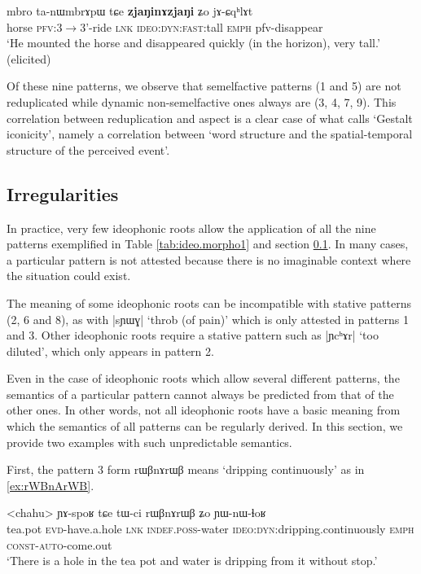 \documentclass[oldfontcommands,oneside,a4paper,11pt]{article}
\newcommand{\ipa}[1]{{\phon \mbox{#1}}} %
\begin{document}
    \begin{exe} 
\ex  \label{ex:ideo9}
\gll 
\ipa{mbro}  	\ipa{ta-nɯmbrɤpɯ}  	\ipa{tɕe}  	\ipa{\textbf{zjaŋinɤzjaŋi}}  	\ipa{ʑo}  	\ipa{jɤ-ɕqʰlɤt}  \\
horse \textsc{pfv}:3$\rightarrow$3'-ride \textsc{lnk} \textsc{ideo:dyn:fast}:tall \textsc{emph} pfv-disappear \\
\glt `He mounted the horse and disappeared quickly (in the horizon), very tall.'  (elicited)
   \end{exe}


Of these nine patterns, we observe that semelfactive  patterns (1 and 5) are not reduplicated while dynamic non-semelfactive ones always are (3, 4, 7, 9). This correlation between reduplication and aspect is a clear case of what \citet[47]{dingemanse11ezra} calls `Gestalt iconicity', namely a correlation between `word structure and the spatial-temporal structure of the perceived event'. 
 

\subsection{Irregularities} \label{sec:ideo.irregular}
In practice, very few ideophonic roots allow the application of all the nine patterns exemplified in Table \ref{tab:ideo.morpho1}  and section \ref{sec:ideo.irregular}.  In many cases, a particular pattern is not attested because there is no imaginable context where the situation could exist.

The meaning of some ideophonic roots can be incompatible with stative patterns (2, 6 and 8), as with |\ipa{sɲɯɣ}| `throb (of pain)' which is only attested in patterns 1 and 3. Other ideophonic roots require a stative pattern such as |\ipa{ɲcʰɤr}| `too diluted', which only appears in pattern 2.

Even in the case of ideophonic roots which allow several different patterns, the semantics of a particular pattern cannot always be predicted from that of the other ones. In other words, not all ideophonic roots have a basic meaning from which the semantics of all patterns can be regularly derived. In this section, we provide two examples with such unpredictable semantics.

First, the pattern 3 form \ipa{rɯβnɤrɯβ} means `dripping continuously' as in \ref{ex:rWBnArWB}.
  \begin{exe} 
\ex  \label{ex:rWBnArWB}
\gll 
<chahu>  \ipa{ɲɤ-spoʁ}  	\ipa{tɕe}  	\ipa{tɯ-ci}  	\ipa{rɯβnɤrɯβ}  	\ipa{ʑo}  	\ipa{ɲɯ-nɯ-ɬoʁ}   \\
tea.pot \textsc{evd}-have.a.hole \textsc{lnk} \textsc{indef.poss}-water \textsc{ideo:dyn}:dripping.continuously \textsc{emph} \textsc{const-auto}-come.out  \\
\glt `There is a hole in the tea pot and water  is dripping from it without stop.'
  \end{exe}
\end{document}
